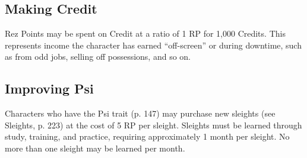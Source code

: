 \subsection{Making Credit}
Rez Points may be spent on Credit at a ratio of 1 RP for 1,000 Credits. This
represents income the character has earned “off-screen” or during downtime,
such as from odd jobs, selling off possessions, and so on.

\subsection{Improving Psi}
Characters who have the Psi trait (p. 147) may purchase new sleights (see
Sleights, p.  223) at the cost of 5 RP per sleight. Sleights must be learned
through study, training, and practice, requiring approximately 1 month per
sleight. No more than one sleight may be learned per month.


